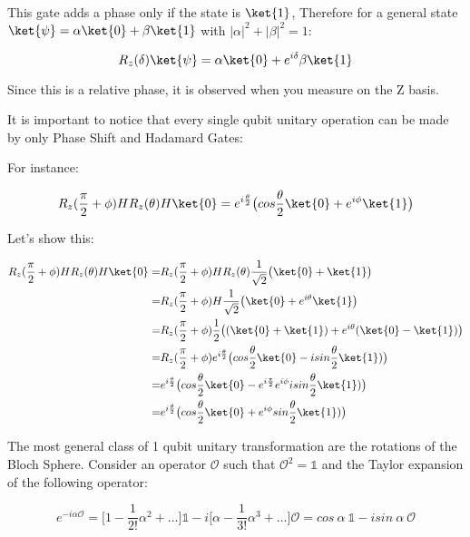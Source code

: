This gate adds a phase only if the state is $\ket{1}$, Therefore for a general state $\ket{\psi} = \alpha \ket{0} + \beta \ket{1}$ with $|\alpha|^2 + |\beta|^2 = 1$:

\begin{equation}
    R_z (\delta) \ket{\psi} =  \alpha \ket{0} + e^{i \delta} \beta \ket{1}
\end{equation}

Since this is a relative phase, it is observed when you measure on the Z basis.

It is important to notice that every single qubit unitary operation can be made by only Phase Shift and Hadamard Gates:

For instance:

\begin{equation}
    R_z (\frac{\pi}{2} + \phi) H R_z(\theta) H \ket{0} = e^{i \frac{\theta}{2}} \big( cos\frac{\theta}{2} \ket{0} + e^{i\phi} \ket{1} \big)
\end{equation}

Let's show this:

\begin{equation}
\begin{split}
    R_z (\frac{\pi}{2} + \phi) H R_z(\theta) H \ket{0}  = & R_z (\frac{\pi}{2} + \phi) H R_z(\theta) \frac{1}{\sqrt{2}} \big( \ket{0} + \ket{1} \big) \\
    = & R_z  (\frac{\pi}{2} + \phi) H \frac{1}{\sqrt{2}} \big( \ket{0} + e^{i \theta} \ket{1} \big) \\
    = & R_z  (\frac{\pi}{2} + \phi) \frac{1}{2} \big( (\ket{0} + \ket{1}) + e^{i \theta} (\ket{0} - \ket{1}) \big) \\
    = & R_z  (\frac{\pi}{2} + \phi) e^{i \frac{\theta}{2}}\big( cos\frac{\theta}{2}\ket{0} - i sin \frac{\theta}{2}\ket{1}) \big) \\
    = & e^{i \frac{\theta}{2}}\big( cos\frac{\theta}{2}\ket{0} - e^{i\frac{\pi}{2}} e^{i\phi} i sin \frac{\theta}{2}\ket{1}) \big) \\
    = & e^{i \frac{\theta}{2}}\big( cos\frac{\theta}{2}\ket{0} + e^{i\phi} sin \frac{\theta}{2}\ket{1}) \big)
\end{split}
\end{equation}

The most general class of 1 qubit unitary transformation are the rotations of the Bloch Sphere. Consider an operator $\mathcal{O}$ such that $\mathcal{O}^2 = \mathds{1}$ and the Taylor expansion of the following operator:

\begin{equation}
    e^{-i\alpha \mathcal{O}} = \bigg[ 1 - \frac{1}{2!} \alpha^2 + \dots \bigg] \mathds{1} - i \bigg[ \alpha - \frac{1}{3!} \alpha^3 + \dots \bigg] \mathcal{O} = cos \ \alpha \ \mathds{1} - i sin \ \alpha \ \mathcal{O}
\end{equation}

